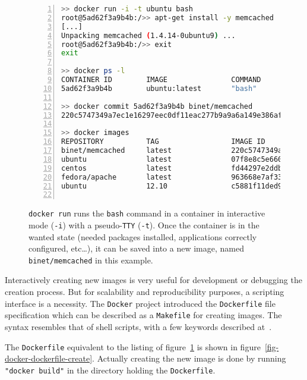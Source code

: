 \documentclass[a4paper]{jpconf}
\begin{document}
\begin{figure}[h]
	\begin{lstlisting}[language=sh,
		basicstyle=\tiny,
		frame=trbl,
		numbers=left,
		showstringspaces=false,
	stringstyle=\ttfamily]
>> docker run -i -t ubuntu bash
root@5ad62f3a9b4b:/>> apt-get install -y memcached
[...]
Unpacking memcached (1.4.14-0ubuntu9) ...
root@5ad62f3a9b4b:/>> exit
exit

>> docker ps -l
CONTAINER ID        IMAGE               COMMAND             CREATED
5ad62f3a9b4b        ubuntu:latest       "bash"              3 minutes ago

>> docker commit 5ad62f3a9b4b binet/memcached
220c5747349a7ec1e16297eec0df11eac277b9a9a6a149e386aff9f63bec868e

>> docker images
REPOSITORY          TAG                 IMAGE ID            CREATED             VIRTUAL SIZE
binet/memcached     latest              220c5747349a        4 minutes ago       190 MB
ubuntu              latest              07f8e8c5e660        5 days ago          188.3 MB
centos              latest              fd44297e2ddb        2 weeks ago         215.7 MB
fedora/apache       latest              963668e7af33        2 weeks ago         627.1 MB
ubuntu              12.10               c5881f11ded9        10 months ago       172.1 MB
 
\end{lstlisting}
\caption{\label{fig-docker-create}\texttt{docker run} runs the \texttt{bash}
	command in a container in interactive mode (\texttt{-i}) with a
pseudo-\texttt{TTY} (\texttt{-t}).
Once the container is in the wanted state (needed packages installed,
applications correctly configured, etc\ldots), it can be saved into a new image,
named \texttt{binet/memcached} in this example.}
\end{figure}

Interactively creating new images is very useful for development or debugging
the creation process.
But for scalability and reproducibility purposes, a scripting interface is a
necessity.
The \texttt{Docker} project introduced the \texttt{Dockerfile} file
specification which can be described as a \texttt{Makefile} for creating images.
The syntax resembles that of shell scripts, with a few keywords described
at~\cite{ref-docker-dockerfile}.

The \texttt{Dockerfile} equivalent to the listing of
figure~\ref{fig-docker-create} is shown in
figure~\ref{fig-docker-dockerfile-create}.
Actually creating the new image is done by running \texttt{"docker build"} in the directory holding the \texttt{Dockerfile}.
\end{document}
